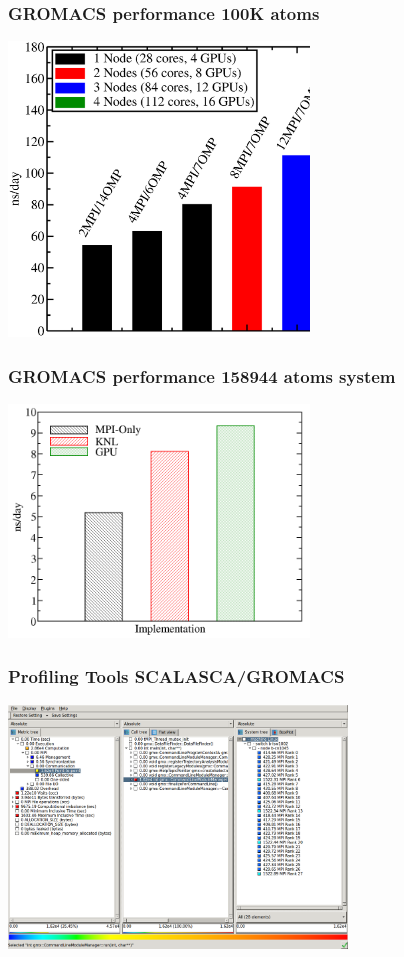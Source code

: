 \begin{frame}
	\frametitle{GROMACS performance 100K atoms}
        \begin{center}
		\includegraphics[width=8cm]{images/data_kebne.eps}
        \end{center}
\end{frame}

\begin{frame}
	\frametitle{GROMACS performance 158944 atoms system}
        \begin{center}
		\includegraphics[width=8cm]{images/profiling_gromacs.png}
        \end{center}
\end{frame}


\begin{frame}
	\frametitle{Profiling Tools SCALASCA/GROMACS}
        \begin{center}
		\includegraphics[width=9cm]{images/cube_gromacs.png}
        \end{center}
\end{frame}



